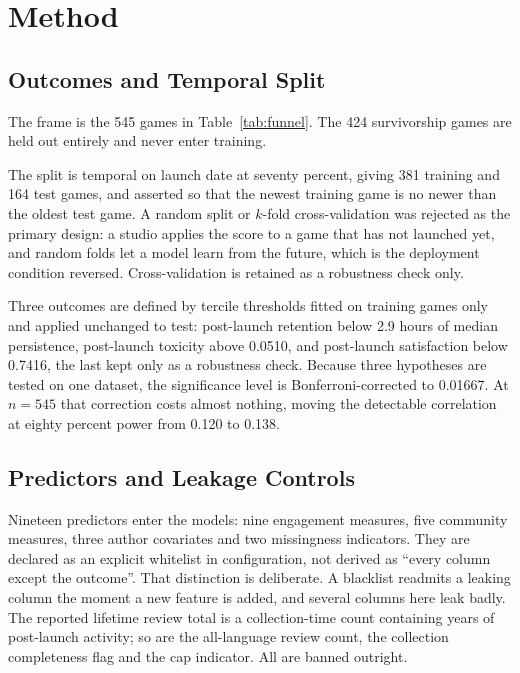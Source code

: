 \documentclass[sigconf]{acmart}
\begin{document}
\section{Method}
\label{sec:method}

\subsection{Outcomes and Temporal Split}
\label{sec:methodSplit}

The frame is the 545 games in Table~\ref{tab:funnel}. The 424 survivorship games are held out
entirely and never enter training.

The split is temporal on launch date at seventy percent, giving 381 training and 164 test games,
and asserted so that the newest training game is no newer than the oldest test game. A random split
or $k$-fold cross-validation was rejected as the primary design: a studio applies the score to a
game that has not launched yet, and random folds let a model learn from the future, which is the
deployment condition reversed. Cross-validation is retained as a robustness check only.

Three outcomes are defined by tercile thresholds fitted on training games only and applied
unchanged to test: post-launch retention below 2.9 hours of median persistence, post-launch
toxicity above 0.0510, and post-launch satisfaction below 0.7416, the last kept only as a
robustness check. Because three hypotheses are tested on one dataset, the significance level is
Bonferroni-corrected to 0.01667. At $n=545$ that correction costs almost nothing, moving the
detectable correlation at eighty percent power from 0.120 to 0.138.

\subsection{Predictors and Leakage Controls}
\label{sec:methodPredictors}

Nineteen predictors enter the models: nine engagement measures, five community measures, three
author covariates and two missingness indicators. They are declared as an explicit whitelist in
configuration, not derived as ``every column except the outcome''. That distinction is deliberate.
A blacklist readmits a leaking column the moment a new feature is added, and several columns here
leak badly. The reported lifetime review total is a collection-time count containing years of
post-launch activity; so are the all-language review count, the collection completeness flag and
the cap indicator. All are banned outright.
\end{document}
